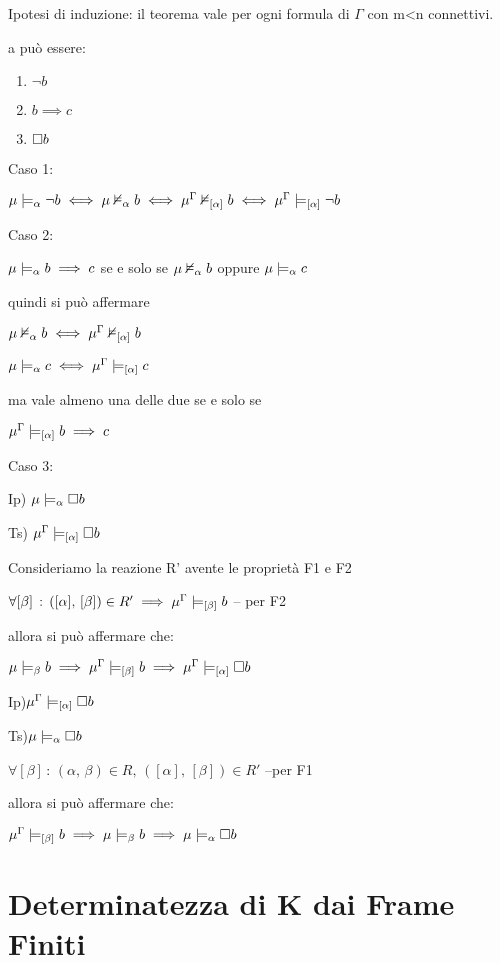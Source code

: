Ipotesi di induzione: il teorema vale per ogni formula di $\Gamma$
con m<n connettivi.

a può essere:
\begin{enumerate}
\item $\neg b$
\item $b\implies c$
\item $\square b$
\end{enumerate}
Caso 1:

$\mu\models_{\alpha}\neg b\iff\mu\nvDash_{\alpha}b\iff\mu^{\Gamma}\nvDash_{[\alpha]}b\iff\mu^{\Gamma}\models_{[\alpha]}\neg b$

Caso 2:

$\mu\models_{\alpha}b\implies c$ se e solo se $\mu\nvDash_{\alpha}b$
oppure $\mu\models_{\alpha}c$

quindi si può affermare

$\mu\nvDash_{\alpha}b\iff\mu^{\Gamma}\nvDash_{[\alpha]}b$

$\mu\models_{\alpha}c\iff\mu^{\Gamma}\models_{[\alpha]}c$

ma vale almeno una delle due se e solo se

$\mu^{\Gamma}\models_{[\alpha]}b\implies c$

Caso 3:

Ip) $\mu\models_{\alpha}\square b$

Ts) $\mu^{\Gamma}\models_{[\alpha]}\square b$

Consideriamo la reazione R' avente le proprietà F1 e F2

$\forall[\beta]\,:\,([\alpha],\,[\beta])\in R'\implies\mu^{\Gamma}\models_{[\beta]}b$
-- per F2

allora si può affermare che:

$\mu\models_{\beta}b\implies\mu^{\Gamma}\models_{[\beta]}b\implies\mu^{\Gamma}\models_{[\alpha]}\square b$

Ip)$\mu^{\Gamma}\models_{[\alpha]}\square b$

Ts)$\mu\models_{\alpha}\square b$

$\forall[\beta]\,:\,(\alpha,\,\beta)\in R,\,([\alpha],\,[\beta])\in R'$
--per F1

allora si può affermare che:

$\mu^{\Gamma}\models_{[\beta]}b\implies\mu\models_{\beta}b\implies\mu\models_{\alpha}\square b$


\section{Determinatezza di K dai Frame Finiti}

